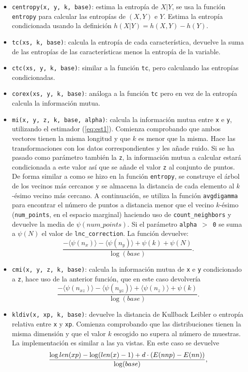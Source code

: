 \documentclass[12pt,a4paper]{report} %
\let\mathbb\relax
\theoremstyle{definition}
\begin{document}
\begin{itemize}
\item \texttt{centropy(x, y, k, base)}: estima la entropía de $X|Y$, se usa la función \texttt{entropy} para calcular las entropías de $(X,Y)$ e $Y$. Estima la entropía condicionada usando la definición $h(X|Y) = h(X,Y)-h(Y)$.
\item \texttt{tc(xs, k, base)}: calcula la entropía de cada característica, devuelve la suma de las entropías de las características menos la entropía de la variable.
\item \texttt{ctc(xs, y, k, base)}: similar a la función \texttt{tc}, pero calculando las entropías condicionadas.
\item \texttt{corex(xs, y, k, base)}: análoga a la función \texttt{tc} pero en vez de la entropía calcula la información mutua.
\item \texttt{mi(x, y, z, k, base, alpha)}: calcula la información mutua entre \texttt{x} e \texttt{y}, utilizando el estimador (\ref{eq:est1}). Comienza comprobando que ambos vectores tienen la misma longitud y que $k$ es menor que la misma. Hace las transformaciones con los datos correspondientes y les añade ruido. Si se ha pasado como parámetro también la  \texttt{z}, la información mutua a calcular estará condicionada a este valor así que se añade el valor \texttt{z} al conjunto de puntos. De forma similar a como se hizo en la función \texttt{entropy}, se construye el árbol de los vecinos más cercanos y se almacena la distancia de cada elemento al $k$-ésimo vecino más cercano. A continuación, se utiliza la función \texttt{avgdigamma} para encontrar el número de puntos a distancia menor que el vecino $k$-ésimo (\texttt{num\_points}, en el espacio marginal) haciendo uso de \texttt{count\_neighbors} y devuelve la media de $\psi(num\_points)$. Si el parámetro \texttt{alpha $>$ 0} se suma a $\psi(N)$ el valor de \texttt{lnc\_correction}. La función devuelve:\[
\frac{- \langle \psi(n_x) \rangle - \langle \psi(n_y) \rangle + \psi(k) + \psi(N)}{\log (base)}.
\]
\item \texttt{cmi(x, y, z, k, base)}: calcula la información mutua de \texttt{x} e \texttt{y} condicionado a \texttt{z}, hace uso de la anterior función, que en este caso devolvería \[
  \frac{- \langle\psi(n_{xz})\rangle - \langle\psi(n_{yz})\rangle + \langle\psi(n_z)\rangle + \psi(k)}{\log(base)}.
\]
\item \texttt{kldiv(x, xp, k, base)}: devuelve la distancia de Kullback Leibler o entropía relativa entre \texttt{x} y \texttt{xp}. Comienza comprobando que las distribuciones tienen la misma dimensión y que el valor $k$ escogido no supera al número de muestras. La implementación es similar a las ya vistas. En este caso se devuelve\[
\frac{\log len(xp) - \log(len(x) -1) + d \cdot (\mathbb{E}( nnp) - \mathbb{E} (nn))}{\log(base)},
\]


\end{itemize}
\end{document}
